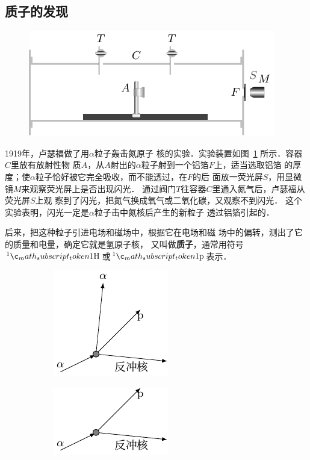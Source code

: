 \subsection{质子的发现}
\begin{figure}[htbp]
    \centering
    \includegraphics{fig/C/9-5.pdf}
    \caption{}\label{fig_C_9-5}
\end{figure}

1919年，卢瑟福做了用$\alpha$粒子轰击氮原子
核的实验．实验装置如图~\ref{fig_C_9-5} 所示．容器$C$里放有放射性物
质$A$，从$A$射出的$\alpha$粒子射到一个铝箔$F$上，适当选取铝箔
的厚度；使$\alpha$粒子恰好被它完全吸收，而不能透过，在$F$的后
面放一荧光屏$S$，用显微镜$M$来观察荧光屏上是否出现闪光．
通过阀门$T$往容器$C$里通入氮气后，卢瑟福从荧光屏$S$上观
察到了闪光，把氮气换成氧气或二氧化碳，又观察不到闪光．
这个实验表明，闪光一定是$\alpha$粒子击中氮核后产生的新粒子
透过铝箔引起的．

后来，把这种粒子引进电场和磁场中，根据它在电场和磁
场中的偏转，测出了它的质量和电量，确定它就是氢原子核，
又叫做\textbf{质子}，通常用符号$\atom{H}{1}{1}$或$\atom{p}{1}{1}$表示．
\begin{figure}[htbp]
    \centering
    \begin{subfigure}{0.3\linewidth}
        \centering
        \includegraphics{fig/C/9-6a.pdf}
        \caption{}\label{fig_C_9-6a}
    \end{subfigure}
    \hfil
    \begin{subfigure}{0.3\linewidth}
        \centering
        \includegraphics{fig/C/9-6b.pdf}
        \caption{}\label{fig_C_9-6b}
    \end{subfigure}
    \caption{}\label{fig_C_9-6}
\end{figure}

